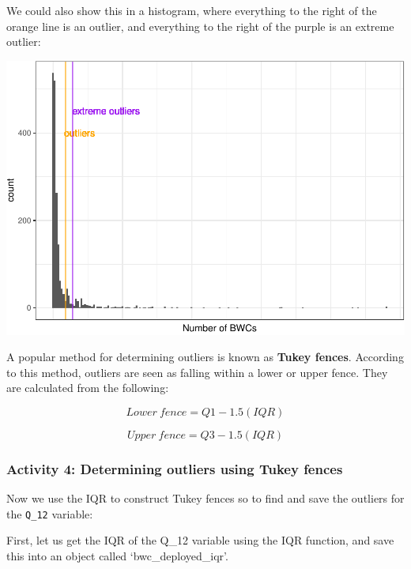 \documentclass[
]{book}
\newenvironment{Shaded}{\begin{snugshade}}{\end{snugshade}}
\newcommand{\AttributeTok}[1]{\textcolor[rgb]{0.77,0.63,0.00}{#1}}
\newcommand{\ConstantTok}[1]{\textcolor[rgb]{0.00,0.00,0.00}{#1}}
\newcommand{\FunctionTok}[1]{\textcolor[rgb]{0.00,0.00,0.00}{#1}}
\newcommand{\NormalTok}[1]{#1}
\newcommand{\OtherTok}[1]{\textcolor[rgb]{0.56,0.35,0.01}{#1}}
\newcommand{\SpecialCharTok}[1]{\textcolor[rgb]{0.00,0.00,0.00}{#1}}
\begin{document}
We could also show this in a histogram, where everything to the right of the orange line is an outlier, and everything to the right of the purple is an extreme outlier:

\includegraphics{04-descriptive-statistics_files/figure-latex/unnamed-chunk-31-1.pdf}

A popular method for determining outliers is known as \textbf{Tukey fences}. According to this method, outliers are seen as falling within a lower or upper fence. They are calculated from the following:

\[ Lower~ fence = Q1 - 1.5(IQR)\]

\[ Upper~ fence = Q3 - 1.5(IQR) \]

\hypertarget{activity-4-determining-outliers-using-tukey-fences}{%
\subsubsection{Activity 4: Determining outliers using Tukey fences}\label{activity-4-determining-outliers-using-tukey-fences}}

Now we use the IQR to construct Tukey fences so to find and save the outliers for the \texttt{Q\_12} variable:

First, let us get the IQR of the Q\_12 variable using the IQR function, and save this into an object called `bwc\_deployed\_iqr'.

\begin{Shaded}
\end{Shaded}
\end{document}

